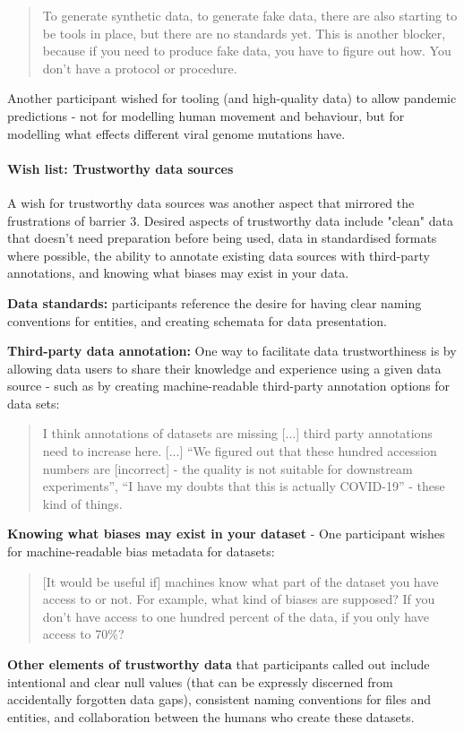 \documentclass{CUP-JNL-DAP}%
\begin{document}
\blockquote{To generate synthetic data, to generate fake data, there are also starting to be tools in place, but there are no standards yet. This is another blocker, because if you need to produce fake data, you have to figure out how. You don't have a protocol or procedure.}

Another participant wished for tooling (and high-quality data) to allow pandemic predictions - not for modelling human movement and behaviour, but for modelling what effects different viral genome mutations have. 

\paragraph{Wish list: Trustworthy data sources}

A wish for trustworthy data sources was another aspect that mirrored the frustrations of barrier 3. Desired aspects of trustworthy data include "clean" data that doesn't need preparation before being used, data in standardised formats where possible, the ability to annotate existing data sources with third-party annotations, and knowing what biases may exist in your data.

\textbf{Data standards:} participants reference the desire for having clear naming conventions for entities, and creating schemata for data presentation.

\textbf{Third-party data annotation:} One way to facilitate data trustworthiness is by allowing data users to share their knowledge and experience using a given data source - such as by creating machine-readable third-party annotation options for data sets: 

\blockquote{I think annotations of datasets are missing [...] third party annotations need to increase here. [...] \enquote{We figured out that these hundred accession numbers are [incorrect] - the quality is not suitable for downstream experiments}, \enquote{I have my doubts that this is actually COVID-19} - these kind of things.}

\textbf{Knowing what biases may exist in your dataset} - One participant wishes for machine-readable bias metadata for datasets: 

\blockquote{[It would be useful if] machines know what part of the dataset you have access to or not. For example, what kind of biases are supposed? If you don't have access to one hundred percent of the data, if you only have access to 70\%?}

\textbf{Other elements of trustworthy data} that participants called out include intentional and clear null values (that can be expressly discerned from accidentally forgotten data gaps), consistent naming conventions for files and entities, and collaboration between the humans who create these datasets.
\end{document}
